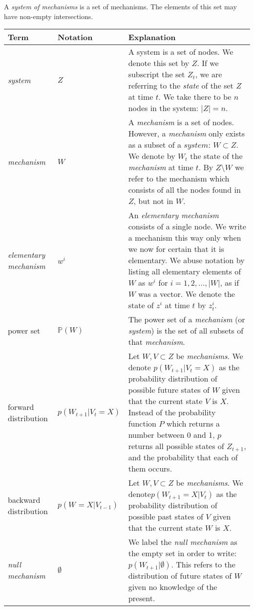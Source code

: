 \begin{definition}{A \textit{system of mechanisms} is a set of mechanisms. The elements of this set may have non-empty intersections.}
\end{definition}




\begin{tabularx}{\textwidth}{ll X}
	Term & Notation & Explanation \\
	\hline
	\endfirsthead
	\hline
	\endhead
	\endfoot
	\hline
	\caption{Key Definitions and Notation} 
	\label{tab:defs}
	\endlastfoot
	\textit{system} & $Z$ & A system is a set of nodes. We denote this set by $Z$. If we subscript the set $Z_t$, we are referring to the \textit{state} of the set $Z$ at time $t$. We take there to be $n$ nodes in the system: $|Z|=n$.\\ 
		\hline
	\textit{mechanism} & $W$ & A \textit{mechanism} is a set of nodes. However, a \textit{mechanism} only exists as a subset of a $\textit{system}$: $W \subset Z$. We denote by $W_t$ the state of the \textit{mechanism} at time $t$. By $Z \setminus W$ we refer to the mechanism which consists of all the nodes found in $Z$, but not in $W$. \\
		\hline
	\textit{elementary mechanism} & $w^i$ & An \textit{elementary mechanism} consists of a single node. We write a mechanism this way only when we now for certain that it is elementary. We abuse notation by listing all elementary elements of $W$ as $w^i$ for $i = 1, 2, \ldots, |W|$, as if $W$ was a vector. We denote the state of $z^i$ at time $t$ by $z^i_t$.\\
		\hline
	power set & $\mathbb{P}(W)$ & The power set of a \textit{mechanism} (or \textit{system}) is the set of all subsets of that \textit{mechanism}.\\
		\hline
	forward distribution & $p(W_{t+1}|V_t=X)$ & Let $W, V \subset Z$ be \textit{mechanisms}. We denote $p(W_{t+1}|V_t= X)$ as the probability distribution of possible future states of $W$ given that the current state $V$ is $X$. Instead of the probability function $P$ which returns a number between 0 and 1, $p$ returns all possible states of $Z_{t+1}$, and the probability that each of them occurs.\\
		\hline
	backward distribution & $p(W_{}=X|V_{t-1})$ & Let $W, V \subset Z$ be \textit{mechanisms}. We denote$p(W_{t+1}=X|V_t)$ as the probability distribution of possible past states of $V$ given that the current state $W$ is $X$. \\
		\hline
	\textit{null mechanism} & $\emptyset$ & We label the \textit{null mechanism} as the empty set in order to write: $p(W_{t+1}|\emptyset)$. This refers to the distribution of future states of $W$ given no knowledge of the present. 
\end{tabularx}


